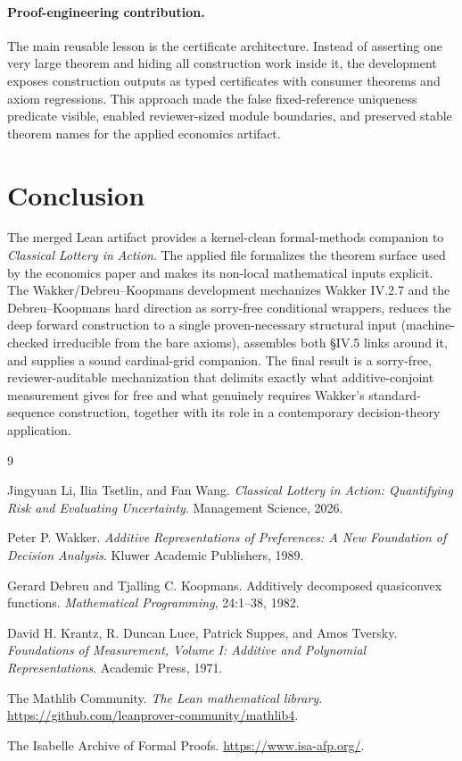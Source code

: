 \documentclass[11pt,english]{article}
\begin{document}
\paragraph{Proof-engineering contribution.}
The main reusable lesson is the certificate architecture.  Instead of asserting one very large theorem and hiding all construction work inside it, the development exposes construction outputs as typed certificates with consumer theorems and axiom regressions.  This approach made the false fixed-reference uniqueness predicate visible, enabled reviewer-sized module boundaries, and preserved stable theorem names for the applied economics artifact.

\section{Conclusion}
\label{sec:conclusion}

The merged Lean artifact provides a kernel-clean formal-methods companion to \emph{Classical Lottery in Action}.  The applied file formalizes the theorem surface used by the economics paper and makes its non-local mathematical inputs explicit.  The Wakker/Debreu--Koopmans development mechanizes Wakker IV.2.7 and the Debreu--Koopmans hard direction as sorry-free conditional wrappers, reduces the deep forward construction to a single proven-necessary structural input (machine-checked irreducible from the bare axioms), assembles both \S IV.5 links around it, and supplies a sound cardinal-grid companion.  The final result is a sorry-free, reviewer-auditable mechanization that delimits exactly what additive-conjoint measurement gives for free and what genuinely requires Wakker's standard-sequence construction, together with its role in a contemporary decision-theory application.

\begin{thebibliography}{9}

Jingyuan Li, Ilia Tsetlin, and Fan Wang.
\newblock \emph{Classical Lottery in Action: Quantifying Risk and Evaluating Uncertainty}.
\newblock Management Science, 2026.

Peter P. Wakker.
\newblock \emph{Additive Representations of Preferences: A New Foundation of Decision Analysis}.
\newblock Kluwer Academic Publishers, 1989.

Gerard Debreu and Tjalling C. Koopmans.
\newblock Additively decomposed quasiconvex functions.
\newblock \emph{Mathematical Programming}, 24:1--38, 1982.

David H. Krantz, R. Duncan Luce, Patrick Suppes, and Amos Tversky.
\newblock \emph{Foundations of Measurement, Volume I: Additive and Polynomial Representations}.
\newblock Academic Press, 1971.

The Mathlib Community.
\newblock \emph{The Lean mathematical library}.
\newblock \url{https://github.com/leanprover-community/mathlib4}.

The Isabelle Archive of Formal Proofs.
\newblock \url{https://www.isa-afp.org/}.

\end{thebibliography}
\end{document}
